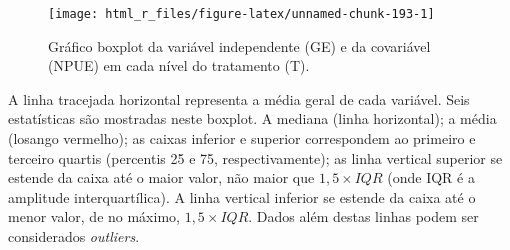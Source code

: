 \documentclass[
]{book}
\newenvironment{Shaded}{\begin{snugshade}}{\end{snugshade}}
\newcommand{\DataTypeTok}[1]{\textcolor[rgb]{0.13,0.29,0.53}{#1}}
\newcommand{\DecValTok}[1]{\textcolor[rgb]{0.00,0.00,0.81}{#1}}
\newcommand{\FloatTok}[1]{\textcolor[rgb]{0.00,0.00,0.81}{#1}}
\newcommand{\KeywordTok}[1]{\textcolor[rgb]{0.13,0.29,0.53}{\textbf{#1}}}
\newcommand{\NormalTok}[1]{#1}
\newcommand{\OperatorTok}[1]{\textcolor[rgb]{0.81,0.36,0.00}{\textbf{#1}}}
\newcommand{\StringTok}[1]{\textcolor[rgb]{0.31,0.60,0.02}{#1}}
\begin{document}
\begin{Shaded}
\end{Shaded}

\begin{figure}

{\centering \texttt{[image: html\_r\_files/figure-latex/unnamed-chunk-193-1]} 

}

\caption{Gráfico boxplot da variável independente (GE) e da covariável (NPUE) em cada nível do tratamento (T).}\label{fig:unnamed-chunk-193}
\end{figure}

   
A linha tracejada horizontal representa a média geral de cada variável. Seis estatísticas são mostradas neste boxplot. A mediana (linha horizontal); a média (losango vermelho); as caixas inferior e superior correspondem ao primeiro e terceiro quartis (percentis 25 e 75, respectivamente); as linha vertical superior se estende da caixa até o maior valor, não maior que \(1,5 \times {IQR}\) (onde IQR é a amplitude interquartílica). A linha vertical inferior se estende da caixa até o menor valor, de no máximo, \(1,5 \times {IQR}\). Dados além destas linhas podem ser considerados \emph{outliers}.
\end{document}
